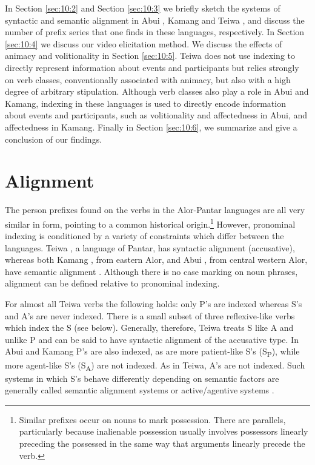 In Section \ref{sec:10:2} and Section \ref{sec:10:3} we briefly sketch the systems of syntactic and semantic alignment in Abui , Kamang  and Teiwa , and discuss the number of prefix series that one finds in these languages, respectively. In Section \ref{sec:10:4} we discuss our video elicitation method. We discuss the effects of animacy and volitionality in Section \ref{sec:10:5}. Teiwa does not use indexing to directly represent information about events and participants but relies strongly on verb classes, conventionally associated with animacy, but also with a high degree of arbitrary stipulation. Although verb classes also play a role in Abui and Kamang, indexing in these languages is used to directly encode information about events and participants, such as volitionality and affectedness in Abui, and affectedness in Kamang. Finally in Section \ref{sec:10:6}, we summarize and give a conclusion of our findings.

\section{Alignment} 
\label{sec:10:2}
The person prefixes found on the verbs in the Alor-Pantar languages are all very similar in form, pointing to a common historical origin.\footnote{Similar prefixes occur on nouns to mark possession. There are parallels, particularly because inalienable possession usually involves possessors linearly preceding the possessed in the same way that arguments linearly precede the verb.} However, pronominal indexing  is conditioned by a variety of constraints which differ between the languages. Teiwa , a language of Pantar, has syntactic alignment  (accusative), whereas both Kamang , from eastern Alor, and Abui , from central western Alor, have semantic alignment . Although there is no case marking on noun phrases, alignment can be defined relative to pronominal indexing. 

For almost all Teiwa verbs the following holds: only P's are indexed whereas S's and A's are never indexed. There is a small subset of three reflexive-like verbs which index the S (see below). Generally, therefore, Teiwa treats S like A and unlike P and can be said to have syntactic alignment of the accusative type. In Abui  and Kamang  P's are also indexed, as are more patient-like S's (S\textsubscript{P}), while more agent-like S's (S\textsubscript{A}) are not indexed. As in Teiwa, A's are not indexed. Such systems in which S's behave differently depending on semantic factors are generally called semantic alignment systems \citep{DonohueEtAl2008} or active/agentive systems \citep{Mithun1991}.


